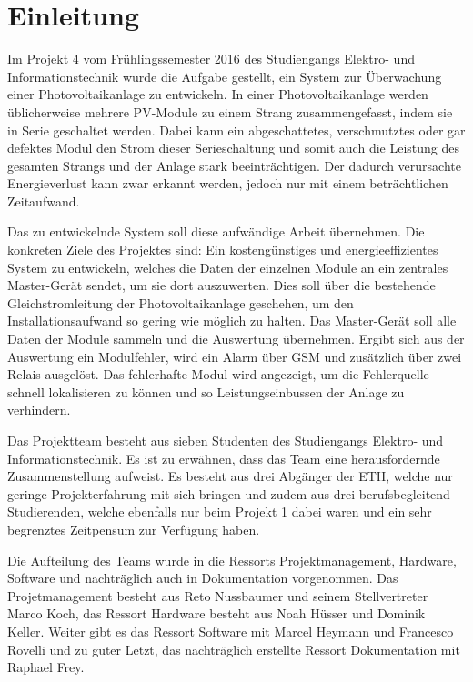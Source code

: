 \chapter{Einleitung}
\label{chap:einleitung}

Im  Projekt  4 vom  Fr\"uhlingssemester  2016  des Studiengangs  Elektro-  und
Informationstechnik wurde  die Aufgabe gestellt, ein  System zur \"Uberwachung
einer  Photovoltaikanlage zu  entwickeln. In  einer Photovoltaikanlage  werden
\"ublicherweise mehrere  PV-Module zu einem Strang  zusammengefasst, indem sie
in Serie geschaltet werden. Dabei  kann ein abgeschattetes, verschmutztes oder
gar defektes Modul den Strom dieser Serieschaltung und somit auch die Leistung
des  gesamten  Strangs und  der  Anlage  stark beeintr\"achtigen. Der  dadurch
verursachte  Energieverlust kann  zwar erkannt  werden, jedoch  nur mit  einem
betr\"achtlichen Zeitaufwand.

Das zu  entwickelnde System  soll diese aufw\"andige  Arbeit \"ubernehmen. Die
konkreten    Ziele    des    Projektes   sind: Ein    kosteng\"unstiges    und
energieeffizientes  System  zu entwickeln,  welches  die  Daten der  einzelnen
Module an ein  zentrales Master-Ger\"at sendet, um  sie dort auszuwerten. Dies
soll   \"uber  die   bestehende   Gleichstromleitung  der   Photovoltaikanlage
geschehen, um den Installationsaufwand so  gering wie m\"oglich zu halten. Das
Master-Ger\"at  soll  alle  Daten  der   Module  sammeln  und  die  Auswertung
\"ubernehmen. Ergibt sich aus  der Auswertung ein Modulfehler,  wird ein Alarm
\"uber GSM  und zus\"atzlich  \"uber zwei Relais  ausgel\"ost. Das fehlerhafte
Modul wird angezeigt, um die Fehlerquelle schnell lokalisieren zu k\"onnen und
so Leistungseinbussen der Anlage zu verhindern.

Das Projektteam  besteht aus  sieben Studenten  des Studiengangs  Elektro- und
Informationstechnik.  Es ist zu erw\"ahnen, dass das Team eine herausfordernde
Zusammenstellung aufweist. Es besteht aus drei  Abg\"anger der ETH, welche nur
geringe Projekterfahrung mit sich bringen  und zudem aus drei berufsbegleitend
Studierenden, welche  ebenfalls nur beim  Projekt 1  dabei waren und  ein sehr
begrenztes Zeitpensum zur Verf\"ugung haben.

Die   Aufteilung  des   Teams   wurde  in   die  Ressorts   Projektmanagement,
Hardware, Software  und nachtr\"aglich auch in  Dokumentation vorgenommen. Das
Projetmanagement  besteht  aus  Reto   Nussbaumer  und  seinem  Stellvertreter
Marco  Koch,  das Ressort  Hardware  besteht  aus  Noah H\"usser  und  Dominik
Keller. Weiter gibt es  das Ressort Software mit Marcel  Heymann und Francesco
Rovelli und zu guter Letzt, das nachtr\"aglich erstellte Ressort Dokumentation
mit Raphael Frey.

